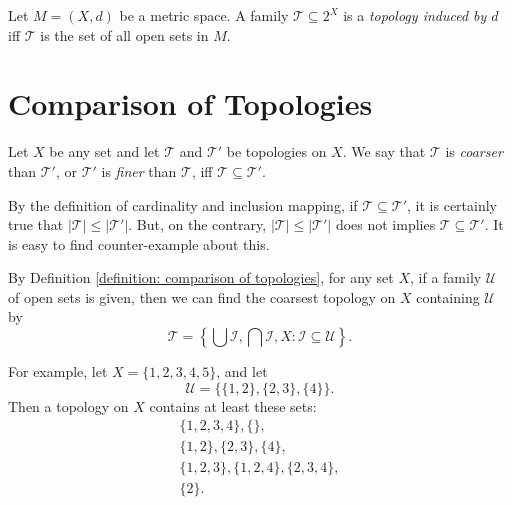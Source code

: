 \begin{definition}
	\label{definition: induced topology}
	Let $M = (X, d)$ be a metric space. A family $\mathcal T \subseteq 2^X$ is a \textit{topology induced by $d$} iff $\mathcal T$ is the set of all open sets in $M$.
\end{definition}


\section{Comparison of Topologies}


\begin{definition}
	\label{definition: comparison of topologies}
	Let $X$ be any set and let $\mathcal T$ and $\mathcal T'$ be topologies on $X$. We say that $\mathcal T$ is \textit{coarser} than $\mathcal T'$, or $\mathcal T'$ is \textit{finer} than $\mathcal T$, iff $\mathcal T \subseteq \mathcal T'$.
\end{definition}


\begin{note}
	By the definition of cardinality and inclusion mapping, if $\mathcal T \subseteq \mathcal T'$, it is certainly true that $| \mathcal T | \le | \mathcal T' |$. But, on the contrary, $| \mathcal T | \le |\mathcal T'|$ does not implies $\mathcal T \subseteq \mathcal T'$. It is easy to find counter-example about this.
\end{note}


\begin{example}
	By Definition \ref{definition: comparison of topologies}, for any set $X$, if a family $\mathcal U$ of open sets is given, then we can find the coarsest topology on $X$ containing $\mathcal U$ by
	$$
	\mathcal T = \left\{ \bigcup \mathcal I, \bigcap \mathcal I, X : \mathcal I \subseteq \mathcal U \right\}.
	$$
	
	For example, let $X = \{1,2,3,4,5\}$, and let
	$$
	\mathcal U = \{\{1,2\}, \{2,3\}, \{4\}\}.
	$$
	Then a topology on $X$ contains at least these sets:
	$$
	\begin{matrix}
		\{1,2,3, 4\}, \{\}, \\
		\{1,2\}, \{2,3\}, \{4\}, \\
		\{1,2,3\}, \{1,2,4\}, \{2,3,4\}, \\
		\{2\}.
	\end{matrix}
	$$
\end{example}


